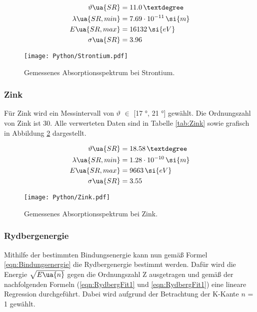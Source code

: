 \begin{align*}
  \vartheta\ua{SR} &= 11.0 \,° \\
  \lambda\ua{SR,min} &= 7.69 \cdot 10^{-11} \, \si{m} \\
  E\ua{SR,max} &= 16132 \, \si{eV} \\
  \sigma\ua{SR} &= 3.96
\end{align*}

\begin{figure}
  \centering
  \texttt{[image: Python/Strontium.pdf]}
  \caption{Gemessenes Absorptionsspektrum bei Strontium.}
  \label{fig:Strontium}
\end{figure}



\newpage %

\subsubsection{Zink}

Für Zink wird ein Messintervall von $\vartheta$ $\in$ [17 °, 21 °] gewählt. Die
Ordnungszahl von Zink ist 30. Alle verwerteten Daten sind in Tabelle \ref{tab:Zink}
sowie grafisch in Abbildung \ref{fig:Zink} dargestellt.

\begin{align*}
  \vartheta\ua{SR} &= 18.58 \,° \\
  \lambda\ua{SR,min} &= 1.28 \cdot 10^{-10} \, \si{m} \\
  E\ua{SR,max} &= 9663 \, \si{eV} \\
  \sigma\ua{SR} &= 3.55
\end{align*}

\begin{figure}
  \centering
  \texttt{[image: Python/Zink.pdf]}
  \caption{Gemessenes Absorptionsspektrum bei Zink.}
  \label{fig:Zink}
\end{figure}



\newpage %

\subsubsection{Rydbergenergie}

Mithilfe der bestimmten Bindungsenergie kann nun gemäß Formel \eqref{eqn:Bindungsenergie}
die Rydbergenergie bestimmt werden. Dafür wird die Energie $\sqrt{E\ua{n}}$ gegen
die Ordnungszahl Z ausgetragen und gemäß der nachfolgenden Formeln (\eqref{eqn:RydbergFit1}
und \eqref{eqn:RydbergFit1}) eine lineare
Regression durchgeführt. Dabei wird aufgrund der Betrachtung der K-Kante $n$ = 1
gewählt.

